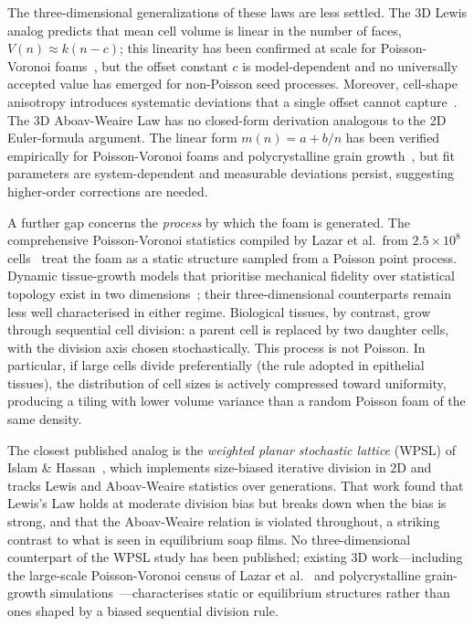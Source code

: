 \documentclass[aps,pre,reprint,amsmath,amssymb,floatfix]{revtex4-2}
\begin{document}
The three-dimensional generalizations of these laws are less settled.
The 3D Lewis analog predicts that mean cell volume is linear in the number
of faces, $V(n)\approx k(n-c)$; this linearity has been confirmed at scale
for Poisson-Voronoi foams~\cite{lazar2013,lautensack2009}, but the offset
constant $c$ is model-dependent and no universally accepted value has emerged
for non-Poisson seed processes.
Moreover, cell-shape anisotropy introduces systematic deviations that a single
offset cannot capture~\cite{schroeder2011,paganin2015}.
The 3D Aboav-Weaire Law has no closed-form derivation analogous to the 2D
Euler-formula argument.
The linear form $m(n)=a+b/n$ has been verified empirically for
Poisson-Voronoi foams and polycrystalline grain growth~\cite{lazar2013,hilhorst2016},
but fit parameters are system-dependent and measurable deviations persist,
suggesting higher-order corrections are needed.

A further gap concerns the \emph{process} by which the foam is generated.
The comprehensive Poisson-Voronoi statistics compiled by Lazar et al.\
from $2.5\times10^8$ cells~\cite{lazar2013} treat the foam as a static
structure sampled from a Poisson point process.
Dynamic tissue-growth models that prioritise mechanical fidelity over
statistical topology exist in two dimensions~\cite{bock2010};
their three-dimensional counterparts remain less well characterised in
either regime.
Biological tissues, by contrast, grow through sequential cell division: a
parent cell is replaced by two daughter cells, with the division axis chosen
stochastically.
This process is not Poisson.
In particular, if large cells divide preferentially (the rule adopted in
epithelial tissues), the distribution of cell sizes is actively compressed
toward uniformity, producing a tiling with lower volume variance than a random
Poisson foam of the same density.

The closest published analog is the \emph{weighted planar stochastic lattice}
(WPSL) of Islam \& Hassan~\cite{islam2014}, which implements size-biased
iterative division in 2D and tracks Lewis and Aboav-Weaire statistics over
generations.
That work found that Lewis's Law holds at moderate division bias but breaks
down when the bias is strong, and that the Aboav-Weaire relation is violated
throughout, a striking contrast to what is seen in equilibrium soap films.
No three-dimensional counterpart of the WPSL study has been published; existing 3D work---including the large-scale Poisson-Voronoi census of Lazar et al.~\cite{lazar2013} and polycrystalline grain-growth simulations~\cite{hilhorst2016}---characterises static or equilibrium structures rather than ones shaped by a biased sequential division rule.
\end{document}
